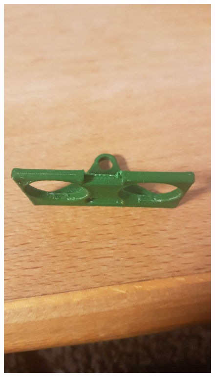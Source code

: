 \begin{figure}[h]%
\begin{minipage}{.5\textwidth}
	\includegraphics[width = 1\textwidth]{"assets/sonicmount_A"}
	\centering
\end{minipage}
\begin{minipage}{.5\textwidth}

\end{minipage}
\end{figure}
